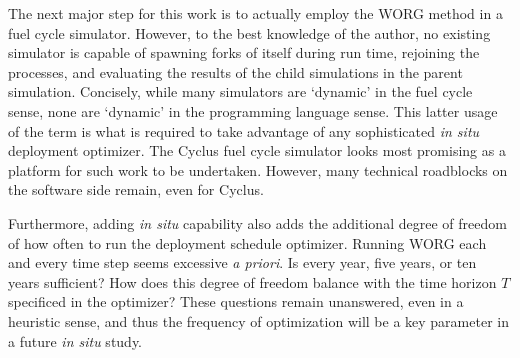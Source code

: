 The next major step for this work is to actually employ the WORG method in 
a fuel cycle simulator.  However, to the best knowledge of the 
author, no existing simulator is capable of spawning forks of itself 
during run time, rejoining the processes, and evaluating the results of the 
child simulations in the parent simulation. Concisely, while many simulators 
are 
`dynamic' in the fuel cycle sense, none are `dynamic' in the programming
language sense. This latter usage of the term is what is required to 
take advantage of any sophisticated \emph{in situ} deployment optimizer.
The Cyclus fuel cycle simulator looks most promising as a platform
for such work to be undertaken. However, many technical roadblocks 
on the software side remain, even for Cyclus.

Furthermore, adding \emph{in situ} capability also adds the additional 
degree of freedom of how often to run the deployment schedule optimizer.
Running WORG each and every
time step seems excessive \emph{a priori}. Is every year, five years,
or ten years sufficient? How does this degree of freedom balance with the
time horizon $T$ specificed in the optimizer? These questions remain unanswered, even 
in a heuristic sense, and thus the frequency of optimization will be a key 
parameter in a future \emph{in situ} study.
